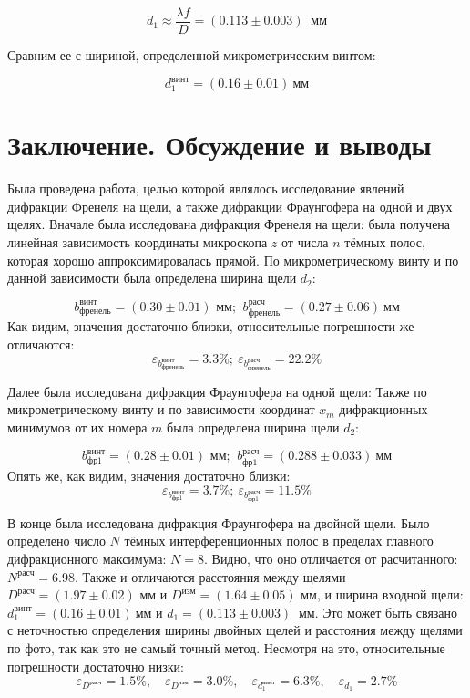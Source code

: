 \documentclass[a4paper,11pt]{extarticle} %
\begin{document}
$$d_1 \approx \frac{\lambda f}{D} = (0.113 \pm 0.003) ~\text{ мм} $$ 

Сравним ее с шириной, определенной микрометрическим винтом: 

$$d_1^{\text{винт}} = (0.16 \pm 0.01) ~\text{мм}$$


\section{Заключение. Обсуждение и выводы}
Была проведена работа, целью которой являлось исследование явлений дифракции Френеля на щели, а также дифракции Фраунгофера на одной и двух щелях. Вначале была исследована дифракция Френеля на щели: была получена линейная зависимость координаты микроскопа $z$ от числа $ n $ тёмных полос, которая хорошо аппроксимировалась прямой. По микрометрическому винту и по данной зависимости была определена ширина щели $d_2$:

$$ b^\text{винт}_{\text{френель}} = (0.30 \pm 0.01)  \text{ мм; } ~ b^{\text{расч}}_\text{френель}  = (0.27 \pm 0.06) ~\text{мм}$$ Как видим, значения достаточно близки, относительные погрешности же отличаются: 
$$\varepsilon_{b^\text{винт}_\text{френель}} = 3.3 \% ; ~\varepsilon_{b^{\text{расч}}_\text{френель}} = 22.2 \% $$

Далее была исследована дифракция Фраунгофера на одной щели:
Также по микрометрическому винту и по зависимости координат $x_m$ дифракционных минимумов от их номера $ m $ была определена ширина щели $d_2$:

$$ b^\text{винт}_\text{фр1} = (0.28 \pm 0.01)  \text{ мм; } ~ b^{\text{расч}}_\text{фр1}  = (0.288 \pm 0.033) ~\text{мм}$$ Опять же, как видим, значения достаточно близки:
$$\varepsilon_{b^\text{винт}_\text{фр1}} = 3.7 \% ; ~\varepsilon_{b^{\text{расч}}_\text{фр1}} = 11.5 \% $$


В конце была исследована дифракция Фраунгофера на двойной щели. Было определено число $N$ тёмных интерференционных полос в пределах главного дифракционного максимума: $N = 8$. Видно, что оно отличается от расчитанного: $N^{\text{расч}} = 6.98$. Также и отличаются расстояния между щелями $D^{\text{расч}} = (1.97 \pm 0.02 ) \text{ мм} $ и $D^{\text{изм}} = (1.64 \pm 0.05) \text{ мм} $, и ширина входной щели: $d_1^{\text{винт}} = (0.16 \pm 0.01) ~\text{мм}$ и $d_1 = (0.113 \pm 0.003) ~\text{ мм} $. Это может быть связано с неточностью определения ширины двойных щелей и расстояния между щелями по фото, так как это не самый точный метод. Несмотря на это, относительные погрешности достаточно низки: $$\varepsilon_{D^{\text{расч}}} = 1.5\%, \quad 
\varepsilon_{D^{\text{изм}}} = 3.0\%, \quad 
\varepsilon_{d_1^{\text{винт}}} = 6.3\%, \quad 
\varepsilon_{d_1} = 2.7\% $$
\end{document}
